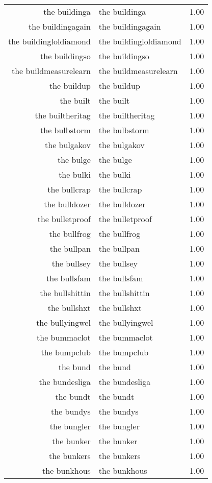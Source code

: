 \begin{table}[ht]
\begin{tabular}{rlr}
  the buildinga & the buildinga & 1.00 \\ 
  the buildingagain & the buildingagain & 1.00 \\ 
  the buildingloldiamond & the buildingloldiamond & 1.00 \\ 
  the buildingso & the buildingso & 1.00 \\ 
  the buildmeasurelearn & the buildmeasurelearn & 1.00 \\ 
  the buildup & the buildup & 1.00 \\ 
  the built & the built & 1.00 \\ 
  the builtheritag & the builtheritag & 1.00 \\ 
  the bulbstorm & the bulbstorm & 1.00 \\ 
  the bulgakov & the bulgakov & 1.00 \\ 
  the bulge & the bulge & 1.00 \\ 
  the bulki & the bulki & 1.00 \\ 
  the bullcrap & the bullcrap & 1.00 \\ 
  the bulldozer & the bulldozer & 1.00 \\ 
  the bulletproof & the bulletproof & 1.00 \\ 
  the bullfrog & the bullfrog & 1.00 \\ 
  the bullpan & the bullpan & 1.00 \\ 
  the bullsey & the bullsey & 1.00 \\ 
  the bullsfam & the bullsfam & 1.00 \\ 
  the bullshittin & the bullshittin & 1.00 \\ 
  the bullshxt & the bullshxt & 1.00 \\ 
  the bullyingwel & the bullyingwel & 1.00 \\ 
  the bummaclot & the bummaclot & 1.00 \\ 
  the bumpclub & the bumpclub & 1.00 \\ 
  the bund & the bund & 1.00 \\ 
  the bundesliga & the bundesliga & 1.00 \\ 
  the bundt & the bundt & 1.00 \\ 
  the bundys & the bundys & 1.00 \\ 
  the bungler & the bungler & 1.00 \\ 
  the bunker & the bunker & 1.00 \\ 
  the bunkers & the bunkers & 1.00 \\ 
  the bunkhous & the bunkhous & 1.00 \\ 

\end{tabular}
\end{table}
